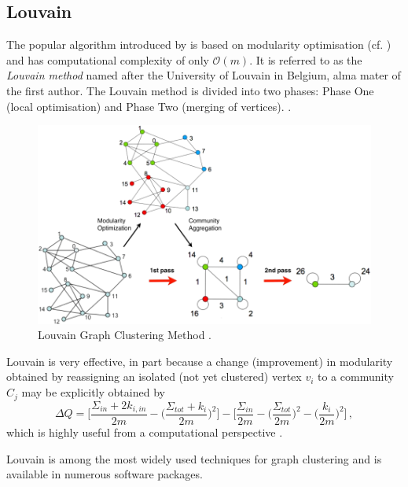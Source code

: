 \documentclass[12pt, a4paper]{article}
\begin{document}
  \subsection{Louvain}
  The popular algorithm introduced by \cite{lambiotte-louvain-clustering} is based on modularity optimisation (cf. ) and has computational complexity of only $\mathcal{O}(m)$.
  It is referred to as the \textit{Louvain method} named after the University of Louvain in Belgium, alma mater of the first author.
  The Louvain method is divided into two phases: Phase One (local optimisation) and Phase Two (merging of vertices).
  \cite{grindrod-lecture-notes}.

  \begin{figure}
    \centering
    \includegraphics[width=\linewidth]{figures/blondel.png}
    \caption{Louvain Graph Clustering Method \cite{lambiotte-louvain-clustering}.}
  \end{figure}

  Louvain is very effective, in part because a change (improvement) in modularity obtained by reassigning an isolated (not yet clustered) vertex $v_i$ to a community $C_j$ may be explicitly obtained by
  $$\Delta Q={\bigg [}{\frac {\Sigma _{in}+2k_{i,in}}{2m}}-{\bigg (}{\frac {\Sigma _{tot}+k_{i}}{2m}}{\bigg )}^{2}{\bigg ]}-{\bigg [}{\frac {\Sigma _{in}}{2m}}-{\bigg (}{\frac {\Sigma _{tot}}{2m}}{\bigg )}^{2}-{\bigg (}{\frac {k_{i}}{2m}}{\bigg )}^{2}{\bigg ]} \,,$$
  which is highly useful from a computational perspective
  \cite{lambiotte-louvain-clustering}.

  Louvain is among the most widely used techniques for graph clustering and is available in numerous software packages.

\end{document}
